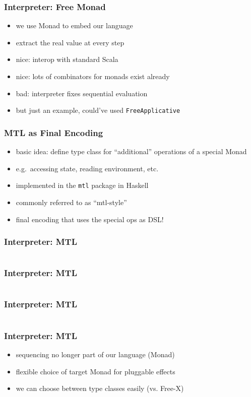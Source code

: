 \documentclass[aspectratio=169, hyperref={colorlinks, linkcolor=beamer@centricgreen}, urlcolor=links]{beamer}
\begin{document}
\begin{frame}
  \frametitle{Interpreter: Free Monad}
  \begin{itemize}
  \item we use Monad to embed our language
  \item extract the real value at every step
  \item nice: interop with standard Scala
  \item nice: lots of combinators for monads exist already
  \item bad: interpreter fixes sequential evaluation
  \item but just an example, could've used \texttt{FreeApplicative}
  \end{itemize}
\end{frame}

\begin{frame}
  \frametitle{MTL as Final Encoding}
  \begin{itemize}
  \item basic idea: define type class for ``additional'' operations of a special Monad
  \item e.g.\ accessing state, reading environment, etc.
  \item implemented in the \texttt{mtl} package in Haskell
  \item commonly referred to as ``mtl-style''
  \item final encoding that uses the special ops as DSL!\@
  \end{itemize}
\end{frame}

\begin{frame}
  \frametitle{Interpreter: MTL}
  \inputminted[fontsize=\footnotesize]{scala}{snippets/final-mtl-expr.scala}
\end{frame}

\begin{frame}
  \frametitle{Interpreter: MTL}
  \inputminted[fontsize=\footnotesize]{scala}{snippets/final-mtl-sample.scala}
\end{frame}

\begin{frame}
  \frametitle{Interpreter: MTL}
  \inputminted[fontsize=\footnotesize]{scala}{snippets/final-mtl-interp.scala}
\end{frame}

\begin{frame}
  \frametitle{Interpreter: MTL}
  \begin{itemize}
  \item sequencing no longer part of our language (Monad)
  \item flexible choice of target Monad for pluggable effects
  \item we can choose between type classes easily (vs. Free-X)
  \end{itemize}
\end{frame}
\end{document}
